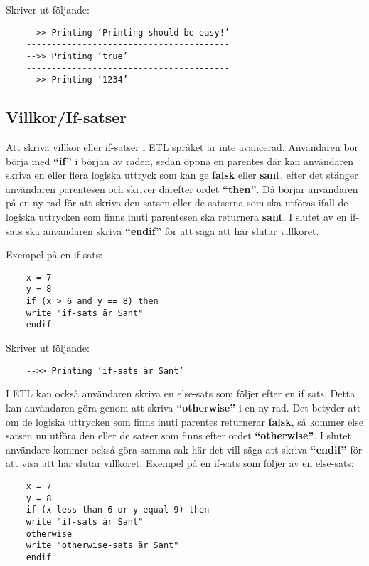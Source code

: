 \documentclass{TDP019mall}
\begin{document}
Skriver ut följande:

\begin{verbatim}
    -->> Printing ‘Printing should be easy!’
    ----------------------------------------
    -->> Printing ‘true’
    ----------------------------------------
    -->> Printing ‘1234’   
\end{verbatim} 


\subsection{Villkor/If-satser}
Att skriva villkor eller if-satser i ETL språket är inte avancerad. Användaren bör börja med \textbf{“if”} i början av raden, 
sedan öppna en parentes där kan användaren skriva en eller flera logiska uttryck som kan ge \textbf{falsk} eller \textbf{sant}, efter det stänger 
användaren parentesen och skriver därefter ordet \textbf{“then”}. Då börjar användaren på en ny rad för att skriva den satsen eller de satserna 
som ska utföras ifall de logiska uttrycken som finns inuti parentesen ska returnera \textbf{sant}. I slutet av en if-sats ska 
användaren skriva \textbf{“endif”} för att säga att här slutar villkoret.
 
Exempel på en if-sats: 
 
\begin{verbatim}
    x = 7
    y = 8
    if (x > 6 and y == 8) then
    write "if-sats är Sant"
    endif
\end{verbatim}

Skriver ut följande:
\begin{verbatim}
    -->> Printing ‘if-sats är Sant’
\end{verbatim}

I ETL kan också användaren skriva en else-sats som följer efter en if sats. Detta kan användaren göra genom att skriva \textbf{“otherwise”} i 
en ny rad. Det betyder att om de logiska uttrycken som finns inuti parentes returnerar \textbf{falsk}, så kommer else satsen nu utföra den eller 
de satser som finns efter ordet \textbf{“otherwise”}. I slutet användare kommer också göra samma sak här det vill säga att skriva \textbf{“endif”} 
för att visa att här slutar villkoret.
\newpage
Exempel på en if-sats som följer av en else-sats: 
\begin{verbatim}
    x = 7
    y = 8
    if (x less than 6 or y equal 9) then
    write "if-sats är Sant"
    otherwise
    write "otherwise-sats är Sant"
    endif
\end{verbatim} 
\end{document}
